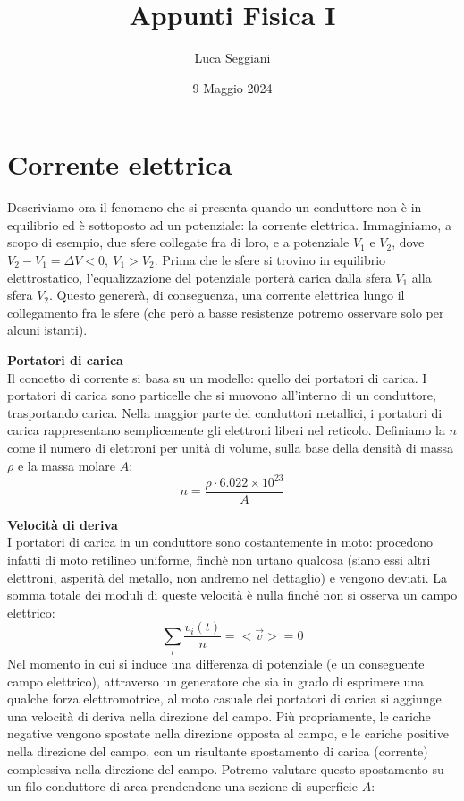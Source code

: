 \documentclass[a4paper,12pt]{article}
\title{Appunti Fisica I}
\author{Luca Seggiani}
\date{9 Maggio 2024}
\begin{document}
\maketitle
\section{Corrente elettrica}
Descriviamo ora il fenomeno che si presenta quando un conduttore non è in equilibrio ed è sottoposto ad un potenziale: la corrente elettrica. Immaginiamo, a scopo di esempio, due sfere collegate fra di loro, e
a potenziale $V_1$ e $V_2$, dove $V_2 - V_1 = \Delta V < 0, \ V_1 > V_2$. Prima che le sfere si trovino in equilibrio elettrostatico, l'equalizzazione del potenziale porterà carica dalla sfera $V_1$ alla
sfera $V_2$. Questo genererà, di conseguenza, una corrente elettrica lungo il collegamento fra le sfere (che però a basse resistenze potremo osservare solo per alcuni istanti).
\par\smallskip
\textbf{Portatori di carica} \\
Il concetto di corrente si basa su un modello: quello dei portatori di carica. I portatori di carica sono particelle che si muovono all'interno di un conduttore, trasportando carica.
Nella maggior parte dei conduttori metallici, i portatori di carica rappresentano semplicemente gli elettroni liberi nel reticolo. Definiamo la $n$ come il numero di elettroni per unità di volume, sulla base
della densità di massa $\rho$ e la massa molare $A$:
$$ n = \frac{\rho \cdot 6.022 \times 10^{23}}{A} $$
\par\smallskip
\textbf{Velocità di deriva} \\
I portatori di carica in un conduttore sono costantemente in moto: procedono infatti di moto retilineo uniforme, finchè non urtano qualcosa (siano essi altri elettroni, asperità del metallo, non andremo nel dettaglio) e vengono
deviati. La somma totale dei moduli di queste velocità è nulla finché non si osserva un campo elettrico:
$$ \sum_i \frac{v_i(t)}{n} = <\vec{v}> = 0 $$
Nel momento in cui si induce una differenza di potenziale (e un conseguente campo elettrico), attraverso un generatore che sia in grado di esprimere una qualche forza elettromotrice, al moto casuale dei portatori di carica
si aggiunge una velocità di deriva nella direzione del campo. Più propriamente, le cariche negative vengono spostate nella direzione opposta al campo, e le cariche positive nella direzione del campo, con un risultante
spostamento di carica (corrente) complessiva nella direzione del campo. Potremo valutare questo spostamento su un filo conduttore di area prendendone una sezione di superficie $A$:
\end{document}
